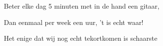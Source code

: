 \documentclass[a4,openany,portrait,tikz]{article}
\begin{document}
\begin{songs}{}
\renewcommand{\thesongnum}{Y}
	

\renewcommand{\thesongnum}{Z}
	 



			Beter elke dag 5 minuten met in de hand een gitaar,
			
			Dan eenmaal per week een uur, 't is echt waar!
		\endscripture	
	
		Het enige dat wij nog echt tekortkomen is schaarste 
		\endscripture	

	




%			
\end{songs}




%
%
\end{document}

